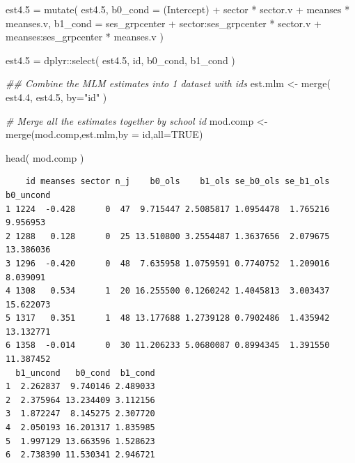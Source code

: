 \documentclass[
  letterpaper,
  DIV=11,
  numbers=noendperiod]{scrreprt}
\newenvironment{Shaded}{\begin{snugshade}}{\end{snugshade}}
\newcommand{\AttributeTok}[1]{\textcolor[rgb]{0.49,0.56,0.16}{#1}}
\newcommand{\CommentTok}[1]{\textcolor[rgb]{0.38,0.63,0.69}{\textit{#1}}}
\newcommand{\ConstantTok}[1]{\textcolor[rgb]{0.53,0.00,0.00}{#1}}
\newcommand{\DocumentationTok}[1]{\textcolor[rgb]{0.73,0.13,0.13}{\textit{#1}}}
\newcommand{\FloatTok}[1]{\textcolor[rgb]{0.25,0.63,0.44}{#1}}
\newcommand{\FunctionTok}[1]{\textcolor[rgb]{0.02,0.16,0.49}{#1}}
\newcommand{\NormalTok}[1]{\textcolor[rgb]{0.00,0.44,0.13}{#1}}
\newcommand{\OtherTok}[1]{\textcolor[rgb]{0.00,0.44,0.13}{#1}}
\newcommand{\SpecialCharTok}[1]{\textcolor[rgb]{0.25,0.44,0.63}{#1}}
\newcommand{\StringTok}[1]{\textcolor[rgb]{0.25,0.44,0.63}{#1}}
\begin{document}
\begin{Shaded}
\begin{Highlighting}[]
\NormalTok{est4}\FloatTok{.5} \OtherTok{=} \FunctionTok{mutate}\NormalTok{( est4}\FloatTok{.5}\NormalTok{, }
                 \AttributeTok{b0\_cond =} \StringTok{\textasciigrave{}}\AttributeTok{(Intercept)}\StringTok{\textasciigrave{}} \SpecialCharTok{+}\NormalTok{ sector }\SpecialCharTok{*}\NormalTok{ sector.v }\SpecialCharTok{+}\NormalTok{ meanses }\SpecialCharTok{*}\NormalTok{ meanses.v,}
                 \AttributeTok{b1\_cond =}\NormalTok{ ses\_grpcenter }\SpecialCharTok{+} \StringTok{\textasciigrave{}}\AttributeTok{sector:ses\_grpcenter}\StringTok{\textasciigrave{}} \SpecialCharTok{*}\NormalTok{ sector.v }\SpecialCharTok{+} \StringTok{\textasciigrave{}}\AttributeTok{meanses:ses\_grpcenter}\StringTok{\textasciigrave{}} \SpecialCharTok{*}\NormalTok{ meanses.v )}

\NormalTok{est4}\FloatTok{.5} \OtherTok{=}\NormalTok{ dplyr}\SpecialCharTok{::}\FunctionTok{select}\NormalTok{( est4}\FloatTok{.5}\NormalTok{, id, b0\_cond, b1\_cond )}


\DocumentationTok{\#\# Combine the MLM estimates into 1 dataset with ids}
\NormalTok{est.mlm }\OtherTok{\textless{}{-}} \FunctionTok{merge}\NormalTok{( est4}\FloatTok{.4}\NormalTok{, est4}\FloatTok{.5}\NormalTok{, }\AttributeTok{by=}\StringTok{"id"}\NormalTok{ )}

\CommentTok{\# Merge all the estimates together by school id}
\NormalTok{mod.comp }\OtherTok{\textless{}{-}} \FunctionTok{merge}\NormalTok{(mod.comp,est.mlm,}\AttributeTok{by =} \StringTok{\textquotesingle{}id\textquotesingle{}}\NormalTok{,}\AttributeTok{all=}\ConstantTok{TRUE}\NormalTok{)}

\FunctionTok{head}\NormalTok{( mod.comp )}
\end{Highlighting}
\end{Shaded}

\begin{verbatim}
    id meanses sector n_j    b0_ols    b1_ols se_b0_ols se_b1_ols b0_uncond
1 1224  -0.428      0  47  9.715447 2.5085817 1.0954478  1.765216  9.956953
2 1288   0.128      0  25 13.510800 3.2554487 1.3637656  2.079675 13.386036
3 1296  -0.420      0  48  7.635958 1.0759591 0.7740752  1.209016  8.039091
4 1308   0.534      1  20 16.255500 0.1260242 1.4045813  3.003437 15.622073
5 1317   0.351      1  48 13.177688 1.2739128 0.7902486  1.435942 13.132771
6 1358  -0.014      0  30 11.206233 5.0680087 0.8994345  1.391550 11.387452
  b1_uncond   b0_cond  b1_cond
1  2.262837  9.740146 2.489033
2  2.375964 13.234409 3.112156
3  1.872247  8.145275 2.307720
4  2.050193 16.201317 1.835985
5  1.997129 13.663596 1.528623
6  2.738390 11.530341 2.946721
\end{verbatim}
\end{document}
